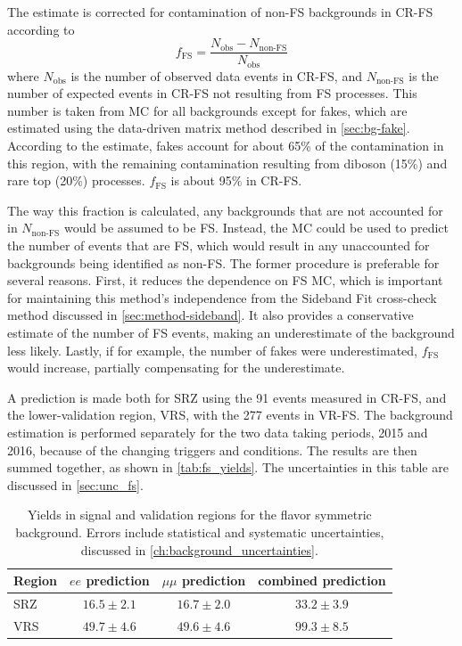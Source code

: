 The estimate is corrected for contamination of non-\ac{FS} backgrounds in CR-FS according to
%
\begin{equation}
f_{\mathrm{FS}} = \frac{N_\text{obs} - N_\text{non-FS}}{N_\text{obs}}
\end{equation}
%
where $N_\text{obs}$ is the number of observed data events in CR-FS, and $N_\text{non-FS}$ is the number of expected events in CR-FS not resulting from \ac{FS} processes. This number is taken from \ac{MC} for all backgrounds except for fakes, which are estimated using the data-driven matrix method described in \autoref{sec:bg-fake}. According to the estimate, fakes account for about 65\% of the contamination in this region, with the remaining contamination resulting from diboson (15\%) and rare top (20\%) processes. $f_{\mathrm{FS}}$ is about 95\% in CR-FS. 

The way this fraction is calculated, any backgrounds that are not accounted for in $N_\text{non-FS}$ would be assumed to be \ac{FS}. Instead, the \ac{MC} could be used to predict the number of events that are \ac{FS}, which would result in any unaccounted for backgrounds being identified as non-\ac{FS}. The former procedure is preferable for several reasons. First, it reduces the dependence on \ac{FS} \ac{MC}, which is important for maintaining this method's independence from the Sideband Fit cross-check method discussed in \autoref{sec:method-sideband}. It also provides a conservative estimate of the number of \ac{FS} events, making an underestimate of the background less likely. Lastly, if for example, the number of fakes were underestimated, $f_{\mathrm{FS}}$ would increase, partially compensating for the underestimate.  

A prediction is made both for SRZ using the 91 events measured in CR-FS, and the lower-\met validation region, VRS, with the 277 events in VR-FS. The background estimation is performed separately for the two data taking periods, 2015 and 2016, because of the changing triggers and conditions. The results are then summed together, as shown in \autoref{tab:fs_yields}. The uncertainties in this table are discussed in \autoref{sec:unc_fs}.

\begin{table}
\begin{center}
 \begin{tabular}{lccc}
   \hline 
   Region & $ee$ prediction & $\mu\mu$ prediction & combined prediction \\
   \hline
   \hline
SRZ & $ 16.5 \pm 2.1 $ & $ 16.7 \pm 2.0 $ & $ 33.2 \pm 3.9 $ \\
VRS & $ 49.7 \pm 4.6 $ & $ 49.6 \pm 4.6 $ & $ 99.3 \pm 8.5 $ \\
\hline
\hline
 \end{tabular}
\end{center}
 \caption{
   Yields in signal and validation regions for the flavor symmetric background. Errors include statistical and systematic uncertainties, discussed in \autoref{ch:background_uncertainties}. }
 \label{tab:fs_yields}
\end{table}

